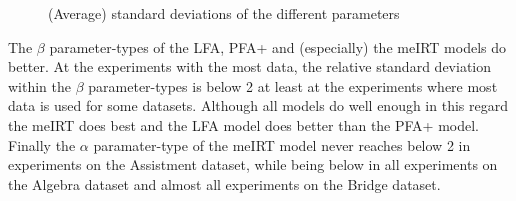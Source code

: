 \documentclass{scrartcl}
\begin{document}
\begin{figure}[h]
\centering

\hspace{0mm}
\caption{(Average) standard deviations of the different parameters}
\label{fig:parvarz}
\end{figure}

The $\beta$ parameter-types of the LFA, PFA+ and (especially) the meIRT models do better. At the experiments with the most data, the relative standard deviation within the $\beta$ parameter-types is below 2 at least at the experiments where most data is used for some datasets. Although all models do well enough in this regard the meIRT does best and the LFA model does better than the PFA+ model. Finally the $\alpha$ paramater-type of the meIRT model never reaches below 2 in experiments on the Assistment dataset, while being below in all experiments on the Algebra dataset and almost all experiments on the Bridge dataset.  
\end{document}
